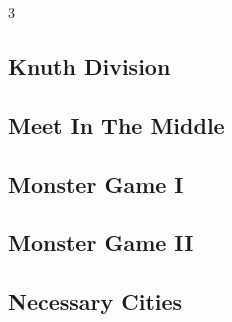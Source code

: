 \documentclass[8pt]{extarticle}
\begin{document}
\begin{multicols*}{3}
\subsection{Knuth Division}
\begin{caixaenunciado}

\end{caixaenunciado}
\vspace{0.3cm}


\subsection{Meet In The Middle}
\begin{caixaenunciado}

\end{caixaenunciado}
\vspace{0.3cm}


\subsection{Monster Game I}
\begin{caixaenunciado}

\end{caixaenunciado}
\vspace{0.3cm}


\subsection{Monster Game II}
\begin{caixaenunciado}

\end{caixaenunciado}
\vspace{0.3cm}


\subsection{Necessary Cities}
\begin{caixaenunciado}

\end{caixaenunciado}
\vspace{0.3cm}



\end{multicols*}
\end{document}
